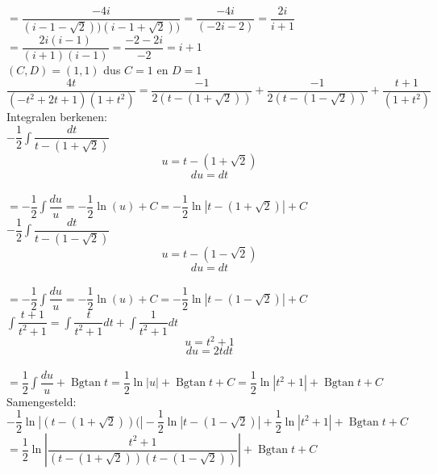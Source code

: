 \documentclass[a4paper]{article}
\begin{document}
$=\dfrac{-4i}{(i-1-\sqrt{2}))(i-1+\sqrt{2}))}=\dfrac{-4i}{(-2i-2)}=\dfrac{2i}{i+1}$\\

$=\dfrac{2i(i-1)}{(i+1)(i-1)}=\dfrac{-2-2i}{-2}=i+1$\\

$(C,D) = (1,1)$ dus $C=1$ en $D=1$\\

$\dfrac{4t}{(-t^2+2t+1)(1+t^2)} = \dfrac{-1}{2(t-(1+\sqrt{2}))} + \dfrac{-1}{2(t-(1-\sqrt{2}))} + \dfrac{t+1}{(1+t^2)}$\\

Integralen berkenen:\\

$-\dfrac{1}{2}\displaystyle\int \dfrac{dt}{t-(1+\sqrt{2})}$\\

$$u=t-(1+\sqrt{2})$$ $$du=dt$$\\

$=-\dfrac{1}{2}\displaystyle\int \dfrac{du}{u} = -\dfrac{1}{2}\ln(u) + C = -\dfrac{1}{2}\ln|t-(1+\sqrt{2})| + C$\\


$-\dfrac{1}{2}\displaystyle\int \dfrac{dt}{t-(1-\sqrt{2})}$\\

$$u=t-(1-\sqrt{2})$$ $$du=dt$$\\

$=-\dfrac{1}{2}\displaystyle\int \dfrac{du}{u} = -\dfrac{1}{2}\ln(u) + C = -\dfrac{1}{2}\ln|t-(1-\sqrt{2})| + C$\\

$\displaystyle\int \dfrac{t+1}{t^2+1} = \displaystyle\int \dfrac{t}{t^2+1}dt + \displaystyle\int \dfrac{1}{t^2+1}dt$\\

$$u=t^2+1$$ $$du=2tdt$$\\

$=\dfrac{1}{2}\displaystyle\int \dfrac{du}{u} + \operatorname{Bgtan}{t} = \dfrac{1}{2}\ln|u| + \operatorname{Bgtan}{t} + C= \dfrac{1}{2}\ln|t^2+1| + \operatorname{Bgtan}{t} + C$\\

Samengesteld:\\

$-\dfrac{1}{2}\ln|(t-(1+\sqrt{2}))(| - \dfrac{1}{2}\ln|t-(1-\sqrt{2})| + \dfrac{1}{2}\ln|t^2+1| + \operatorname{Bgtan}{t} + C$\\

$= \dfrac{1}{2}\ln\left|\dfrac{t^2+1}{(t-(1+\sqrt{2}))(t-(1-\sqrt{2}))}\right| + \operatorname{Bgtan}{t} + C$\\
\end{document}
